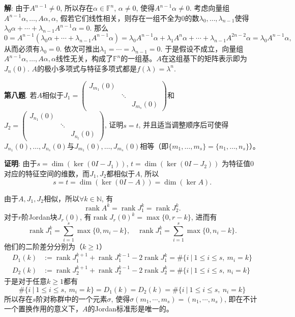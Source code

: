 {\bf 解}: 由于$A^{n-1} \neq 0$, 所以存在$\alpha \in \mathbb{F}^n$, $\alpha \neq 0$, 使得$A^{n-1} \alpha \neq 0$. 考虑向量组$A^{n-1} \alpha, \ldots, A\alpha, \alpha$, 假若它们线性相关，则存在一组不全为$0$的数$\lambda_0, \ldots, \lambda_{n-1}$使得$\lambda_0 \alpha + \cdots + \lambda_{n-1} A^{n-1} \alpha = 0$. 那么
$$0 = A^{n-1}(\lambda_0 \alpha + \cdots + \lambda_{n-1} A^{n-1} \alpha) = \lambda_0 A^{n-1} \alpha + \lambda_1 A^{n} \alpha + \cdots + \lambda_{n-1} A^{2n-2} \alpha = \lambda_0 A^{n-1} \alpha,$$
从而必须有$\lambda_0 = 0$. 依次可推出$\lambda_1 = \cdots = \lambda_{n-1} = 0$. 于是假设不成立，向量组$A^{n-1} \alpha, \ldots, A\alpha, \alpha$线性无关，构成了$\mathbb{F}^n$的一组基。$A$在这组基下的矩阵表示即为$J_n(0)$. $A$的极小多项式与特征多项式都是$f(\lambda) = \lambda^n$.

\newpageorvspace

{\bf 第八题}. 若$A$相似于$J_1 = \begin{pmatrix} J_{m_1}(0) & & \\ & \ddots & \\ & & J_{m_s}(0) \end{pmatrix}$和$J_2 = \begin{pmatrix} J_{n_1}(0) & & \\ & \ddots & \\ & & J_{n_t}(0) \end{pmatrix}$, 证明$s=t$, 并且适当调整顺序后可使得$J_{n_1}(0), \ldots, J_{n_s}(0)$与$J_{m_1}(0), \ldots, J_{m_s}(0)$相等（即$\{ m_1, \ldots, m_s \} = \{ n_1, \ldots, n_s \}$）。

{\bf 证明}: 由于$s = \dim (\ker (0 I - J_1))$, $t = \dim (\ker (0 I - J_2))$ 为特征值$0$对应的特征空间的维数，而$J_1, J_2$都相似于$A$, 所以
$$s = t = \dim(\ker (0 I - A)) = \dim(\ker A).$$

由于$A, J_1, J_2$相似，所以$\forall k \in \mathbb{N}$, 有
$$\operatorname{rank} A^k = \operatorname{rank} J_1^k = \operatorname{rank} J_2^k.$$
对于$r$阶Jordan块$J_r(0)$, 有$\operatorname{rank} J_r(0)^k = \max \{ 0, r-k \}$, 进而有
$$\operatorname{rank} J_1^k = \sum_{i=1}^s \max \{ 0, m_i-k \}, \quad \operatorname{rank} J_1^k = \sum_{i=1}^s \max \{ 0, n_i-k \}.$$
他们的二阶差分分别为（$k\geqslant 1$）
\begin{align*}
D_1(k) & := \operatorname{rank} J_1^{k+1} + \operatorname{rank} J_1^{k-1} - 2 \operatorname{rank} J_1^{k} = \# \{ i \ |\ 1 \leqslant i \leqslant s, ~ m_i = k \} \\
D_2(k) & := \operatorname{rank} J_2^{k+1} + \operatorname{rank} J_2^{k-1} - 2 \operatorname{rank} J_2^{k} = \# \{ i \ |\ 1 \leqslant i \leqslant s, ~ n_i = k \}
\end{align*}
于是对于任意$k\geqslant 1$都有
$$\# \{ i \ |\ 1 \leqslant i \leqslant s, ~ m_i = k \} = D_1(k) = D_2(k) = \# \{ i \ |\ 1 \leqslant i \leqslant s, ~ n_i = k \}$$
所以存在$s$阶对称群中的一个元素$\sigma$, 使得$\sigma(m_1, \cdots, m_s) = (n_1, \cdots, n_s)$, 即在不计一个置换作用的意义下，$A$的Jordan标准形是唯一的。




